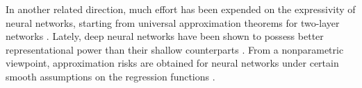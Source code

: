 
In another related direction, much effort has been expended on the expressivity of neural networks, starting from universal
approximation theorems for two-layer networks \citep{cybenko1989approximation,hornik1989multilayer,barron1993universal}. Lately, deep neural networks have been shown to possess better representational power than their shallow counterparts \citep{delalleau2011shallow,telgarsky2016benefits,eldan2016power,mhaskar2016deep,yarotsky2017error,chen2019efficient}. From a nonparametric viewpoint, approximation risks are obtained for neural networks under certain smooth assumptions on the regression functions \citep{schmidt2017nonparametric,suzuki2018adaptivity,klusowski2018approximation,liang2018well,bauer2019deep,ma2019barron}.



